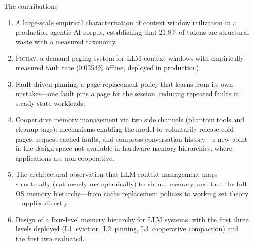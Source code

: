 The contributions:
\begin{enumerate}
  \item A large-scale empirical characterization of context
    window utilization in a production agentic AI corpus, establishing that
    21.8\% of tokens are structural waste with a measured taxonomy.
  \item \textsc{Pichay}, a demand paging system for LLM context
    windows with empirically measured fault rate (0.0254\% offline,
    deployed in production).
  \item Fault-driven pinning: a page replacement policy that
    learns from its own mistakes---one fault pins a page for the
    session, reducing repeated faults in steady-state workloads.
  \item Cooperative memory management via two side channels
    (phantom tools and cleanup tags): mechanisms enabling the model
    to voluntarily release cold pages, request cached faults, and
    compress conversation history---a new point in the design space
    not available in hardware memory hierarchies, where applications
    are non-cooperative.
  \item The architectural observation that LLM context management
    maps structurally (not merely metaphorically) to virtual memory,
    and that the full OS memory hierarchy---from cache replacement
    policies to working set theory---applies directly.
  \item Design of a four-level memory hierarchy for LLM systems,
    with the first three levels deployed (L1~eviction, L2~pinning,
    L3~cooperative compaction) and the first two evaluated.
\end{enumerate}

